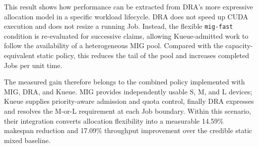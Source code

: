 This result shows how performance can be extracted from DRA's more expressive allocation model in a specific workload lifecycle. DRA does not speed up CUDA execution and does not resize a running Job. Instead, the flexible \texttt{mig-fast} condition is re-evaluated for successive claims, allowing Kueue-admitted work to follow the availability of a heterogeneous MIG pool. Compared with the capacity-equivalent static policy, this reduces the tail of the pool and increases completed Jobs per unit time.

The measured gain therefore belongs to the combined policy implemented with MIG, DRA, and Kueue. MIG provides independently usable S, M, and L devices; Kueue supplies priority-aware admission and quota control, finally DRA expresses and resolves the M-or-L requirement at each Job boundary. Within this scenario, their integration converts allocation flexibility into a measurable 14.59\% makespan reduction and 17.09\% throughput improvement over the credible static mixed baseline.
